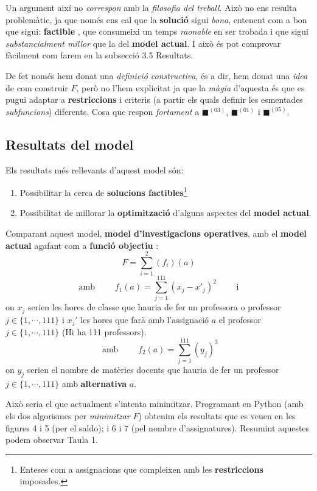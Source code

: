 \documentclass[10pt,twocolumn]{article}
\begin{document}
Un argument així no \textit{correspon} amb la \textit{filosofia del treball}. Això no ens resulta problemàtic, ja que només ens cal que la \textbf{solució} sigui \textit{bona}, entenent com a bon que sigui: \textbf{factible} , que consumeixi un temps \textit{raonable} en ser trobada i que sigui \textit{substancialment millor} que la del \textbf{model actual}. I això és pot comprovar fàcilment com farem en la subsecció 3.5 Resultats.

De fet només hem donat una \textit{definició constructiva}, és a dir, hem donat una \textit{idea} de com construir $F$, però no l'hem explicitat ja que la \textit{màgia} d'aquesta és que es pugui adaptar a \textbf{restriccions} i criteris (a partir els quals definir les esmentades \textit{subfuncions}) diferents. Cosa que respon \textit{fortament} a  {\color{green!60}$\blacksquare$}$^{(03)}$, {\color{cyan!60}$\blacksquare$}$^{(01)}$ i {\color{violet!60}$\blacksquare$}$^{(05)}$.
\subsection{Resultats del model}
Els resultats més rellevants d'aquest model són:
\begin{enumerate}
	\item Possibilitar la cerca de \textbf{solucions factibles}\footnote{Enteses com a assignacions que compleixen amb les \textbf{restriccions} imposades. }
	\item Possibilitat de millorar la \textbf{optimització} d'alguns aspectes del \textbf{model actual}.
\end{enumerate}
Comparant aquest model, \textbf{model d'investigacions operatives}, amb el \textbf{model actual} agafant com a \textbf{funció objectiu} :
$$
F=\sum_{i=1}^{2}(f_i)(a) 
$$
$$\text{ amb } \qquad f_1(a)=\sum_{j=1}^{111} (x_j-x'_j)^2 \qquad \text{ i }$$  
on $x_j$ serien les hores de classe que hauria de fer un professora o professor $j \in \{1,\cdots,111\}$ i $x_j'$ les hores que farà amb l'assignació $a$ el professor $j \in \{1,\cdots,111\}$ (Hi ha 111 professors).
$$\text{ amb }  \qquad f_2(a)=\sum_{j=1}^{111} (y_j)^3$$
on $y_j$ serien el nombre de matèries docents que hauria de fer un professor $j \in \{1,\cdots,111\}$   amb \textbf{alternativa} $a$. 

Això seria el que actualment s'intenta minimitzar. Programant en Python (amb els dos algorismes per \textit{minimitzar} $F$) obtenim els resultats que es veuen en les figures 4 i 5 (per el saldo); i 6 i 7 (pel nombre d'assignatures).
Resumint aquestes podem observar Taula 1. 
\vspace{3mm}
\end{document}
